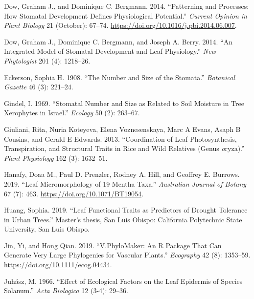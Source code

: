\documentclass[
  12pt,
]{article}
\newlength{\cslhangindent}
\newlength{\cslentryspacingunit} %
\newenvironment{CSLReferences}[2] %
 {%
  \setlength{\parindent}{0pt}
  \ifodd #1
  \let\oldpar\par
  \def\par{\hangindent=\cslhangindent\oldpar}
  \fi
  \setlength{\parskip}{#2\cslentryspacingunit}
 }%
 {}
\begin{document}
\begin{CSLReferences}{1}{0}
\leavevmode{}%
Dow, Graham J., and Dominique C. Bergmann. 2014. {``Patterning and Processes: How Stomatal Development Defines Physiological Potential.''} \emph{Current Opinion in Plant Biology} 21 (October): 67--74. \url{https://doi.org/10.1016/j.pbi.2014.06.007}.

\leavevmode{}%
Dow, Graham J., Dominique C. Bergmann, and Joseph A. Berry. 2014. {``An Integrated Model of Stomatal Development and Leaf Physiology.''} \emph{New Phytologist} 201 (4): 1218--26.

\leavevmode{}%
Eckerson, Sophia H. 1908. {``The Number and Size of the Stomata.''} \emph{Botanical Gazette} 46 (3): 221--24.

\leavevmode{}%
Gindel, I. 1969. {``Stomatal Number and Size as Related to Soil Moisture in Tree Xerophytes in {Israel}.''} \emph{Ecology} 50 (2): 263--67.

\leavevmode{}%
Giuliani, Rita, Nuria Koteyeva, Elena Voznesenskaya, Marc A Evans, Asaph B Cousins, and Gerald E Edwards. 2013. {``Coordination of Leaf Photosynthesis, Transpiration, and Structural Traits in Rice and Wild Relatives (Genus \emph{o}ryza).''} \emph{Plant Physiology} 162 (3): 1632--51.

\leavevmode{}%
Hanafy, Doaa M., Paul D. Prenzler, Rodney A. Hill, and Geoffrey E. Burrows. 2019. {``Leaf Micromorphology of 19 {Mentha} Taxa.''} \emph{Australian Journal of Botany} 67 (7): 463. \url{https://doi.org/10.1071/BT19054}.

\leavevmode{}%
Huang, Sophia. 2019. {``Leaf Functional Traits as Predictors of Drought Tolerance in Urban Trees.''} Master's thesis, San Luis Obispo: California Polytechnic State University, San Luis Obispo.

\leavevmode{}%
Jin, Yi, and Hong Qian. 2019. {``V.{PhyloMaker}: An {R} Package That Can Generate Very Large Phylogenies for Vascular Plants.''} \emph{Ecography} 42 (8): 1353--59. \url{https://doi.org/10.1111/ecog.04434}.

\leavevmode{}%
Juhász, M. 1966. {``Effect of Ecological Factors on the Leaf Epidermis of Species {Solanum}.''} \emph{Acta Biologica} 12 (3-4): 29--36.


\end{CSLReferences}
\end{document}
